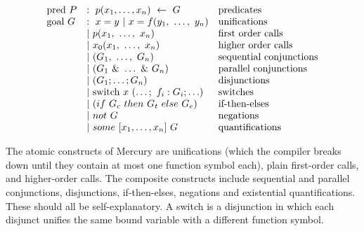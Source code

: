 $$
\begin{array}{lll}
\mbox{pred}~P
    & :~ p(x_1, \ldots, x_n)~\leftarrow~G
        & \hbox{predicates} \\
\mbox{goal}~G
    & :~ x = y ~|~ x = f(y_1,~\ldots,~y_n)
        & \hbox{unifications}\\
    & |~ p(x_1,~\ldots,~x_n)
        & \hbox{first order calls} \\
    & |~ x_0(x_1,~\ldots,~x_n)
        & \hbox{higher order calls} \\
    & |~ (G_1,~\ldots,~G_n)
        & \hbox{sequential conjunctions}\\
    & |~ (G_1~\&~\ldots~\&~G_n)
        & \hbox{parallel conjunctions}\\
    & |~ (G_1 ; \ldots ; G_n)
        & \hbox{disjunctions}\\
    & |~ \hbox{switch}~x~(\ldots;~f_i: G_i ; \ldots)
        & \hbox{switches}\\
    & |~ (if~G_c~then~G_t~else~G_e)
        & \hbox{if-then-elses}\\
    & |~ not~G
        & \hbox{negations}\\
    & |~ some~[x_1,\ldots,x_n]~G
        & \hbox{quantifications}\\
\end{array}
$$
\label{fig:abstractsyntax}

\noindent
The atomic constructs of Mercury are unifications
(which the compiler breaks down until they contain
at most one function symbol each),
plain first-order calls,
and higher-order calls.
The composite constructs include
sequential and parallel conjunctions,
disjunctions, if-then-elses, negations and existential quantifications.
These should all be self-explanatory.
A switch is a disjunction in which
each disjunct unifies the same bound variable
with a different function symbol.

